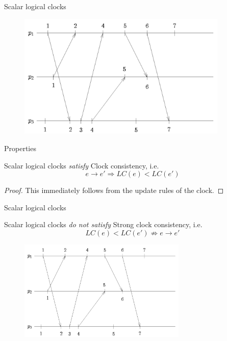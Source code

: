 \begin{frame}{Scalar logical clocks}

\begin{figure} 
\includegraphics[width=10cm]{figs/02/figure-4}
\end{figure}

\end{frame}


\begin{frame}{Properties}

\begin{theorem}
Scalar logical clocks \emph{satisfy} Clock consistency, i.e.
\[
  e \rightarrow e' \Rightarrow LC(e) < LC(e')
\]
\end{theorem}

\pause
\begin{proof}
This immediately follows from the update rules of the clock.
\end{proof}




\end{frame}

\begin{frame}{Scalar logical clocks}

\begin{theorem}
Scalar logical clocks \emph{do not satisfy} Strong clock consistency, i.e.
\[
  LC(e) < LC(e') \not\Rightarrow e \rightarrow e' 
\]
\end{theorem}

\begin{figure} 
\includegraphics[width=8cm]{figs/02/figure-4}
\end{figure}



\end{frame}

